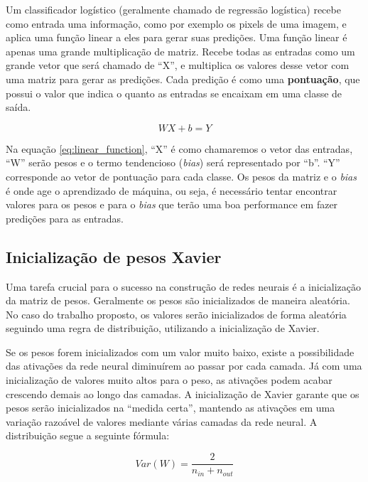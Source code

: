 Um classificador logístico (geralmente chamado de regressão
logística\cite{Goodfellow-et-al-2016-Book}) recebe como entrada uma
informação, como por exemplo os pixels de uma imagem, e aplica uma
função linear a eles para gerar suas predições. Uma função linear é
apenas uma grande multiplicação de matriz. Recebe todas as entradas
como um grande vetor que será chamado de ``X'', e multiplica os
valores desse vetor com uma matriz para gerar as predições. Cada
predição é como uma {\bf pontuação}, que possui o valor que indica o
quanto as entradas se encaixam em uma classe de saída.

\begin{equation} \label{eq:linear_function}
   WX + b = Y
\end{equation}

Na equação \ref{eq:linear_function}, ``X'' é como chamaremos o vetor
das entradas, ``W'' serão pesos e o termo tendencioso (\textit{bias})
será representado por ``b''. ``Y'' corresponde ao vetor de pontuação
para cada classe. Os pesos da matriz e o \textit{bias} é onde age o
aprendizado de máquina, ou seja, é necessário tentar encontrar valores
para os pesos e para o \textit{bias} que terão uma boa performance em
fazer predições para as entradas.

\subsection{Inicialização de pesos Xavier}

Uma tarefa crucial para o sucesso na construção de redes neurais é a
inicialização da matriz de pesos. Geralmente os pesos são
inicializados de maneira aleatória. No caso do trabalho proposto,
os valores serão inicializados de forma aleatória seguindo uma regra
de distribuição, utilizando a inicialização de Xavier\cite{Glorot}.

Se os pesos forem inicializados com um valor muito baixo, existe a
possibilidade das ativações da rede neural diminuírem ao passar por
cada camada. Já com uma inicialização de valores muito altos para o
peso, as ativações podem acabar crescendo demais ao longo das
camadas. A inicialização de Xavier garante que os pesos serão
inicializados na ``medida certa'', mantendo as ativações em uma
variação razoável de valores mediante várias camadas da rede neural. A
distribuição segue a seguinte fórmula:

\begin{equation}
  Var(W) = \frac{2}{n_{in}+n_{out}}
\end{equation}

